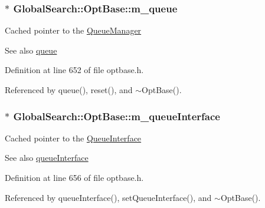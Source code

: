\subsubsection[{m\+\_\+queue}]{$\ast$ Global\+Search\+::\+Opt\+Base\+::m\+\_\+queue\hspace{0.3cm}{\ttfamily [protected]}}\label{classGlobalSearch_1_1OptBase_a187a29ceafe0c4a45ecb7a925267f93a}
Cached pointer to the \hyperlink{classGlobalSearch_1_1QueueManager}{Queue\+Manager} \begin{DoxySeeAlso}{See also}
\hyperlink{classGlobalSearch_1_1OptBase_aa10982ae8ea63745203a025b2be8054d}{queue} 
\end{DoxySeeAlso}


Definition at line 652 of file optbase.\+h.



Referenced by queue(), reset(), and $\sim$\+Opt\+Base().

\hypertarget{classGlobalSearch_1_1OptBase_a8f5f83dae1456bbff32ea9b3b6731ba0}{}
\subsubsection[{m\+\_\+queue\+Interface}]{$\ast$ Global\+Search\+::\+Opt\+Base\+::m\+\_\+queue\+Interface\hspace{0.3cm}{\ttfamily [protected]}}\label{classGlobalSearch_1_1OptBase_a8f5f83dae1456bbff32ea9b3b6731ba0}
Cached pointer to the \hyperlink{classGlobalSearch_1_1QueueInterface}{Queue\+Interface} \begin{DoxySeeAlso}{See also}
\hyperlink{classGlobalSearch_1_1OptBase_a73faf60edcd3db57538349f5a636576e}{queue\+Interface} 
\end{DoxySeeAlso}


Definition at line 656 of file optbase.\+h.



Referenced by queue\+Interface(), set\+Queue\+Interface(), and $\sim$\+Opt\+Base().

\hypertarget{classGlobalSearch_1_1OptBase_a723a6dd0bb93aff451007ccb079e2f65}{}
